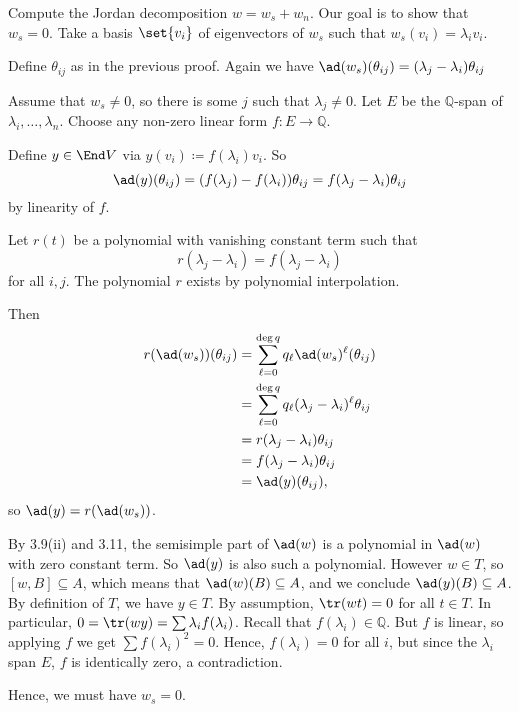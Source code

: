 Compute the Jordan decomposition $w = w_s + w_n$. Our goal is to show that $w_s = 0$.
Take a basis $\set{v_i}$ of eigenvectors of $w_s$ such that $w_s(v_i) = \lambda_iv_i$.

Define $\theta_{ij}$ as in the previous proof. Again we have
$\ad(w_s)(\theta_{ij}) = (\lambda_j - \lambda_i)\theta_{ij}$

Assume that $w_s\neq 0$, so there is some $j$ such that $\lambda_j\neq 0$.
Let $E$ be the $\mathbb{Q}$-span of $\lambda_i, \ldots, \lambda_n$.
Choose any non-zero linear form $f\colon E\to \mathbb{Q}$.

Define $y \in \End V$ via $y(v_i)\coloneqq f(\lambda_i)v_i$.
So
\[ \ad(y)(\theta_{ij}) = (f(\lambda_j) - f(\lambda_i))\theta_{ij}
= f(\lambda_j - \lambda_i)\theta_{ij} \]
by linearity of $f$.

Let $r(t)$ be a polynomial with vanishing constant term such that
\[ r(\lambda_j - \lambda_i) = f(\lambda_j - \lambda_i) \]
for all $i, j$. The polynomial $r$ exists by polynomial interpolation.

Then
\begin{align*}
	r(\ad(w_s))(\theta_{ij}) &= \sum_{\ell = 0}^{\deg q}q_\ell\ad(w_s)^\ell(\theta_{ij})\\
	&= \sum_{\ell = 0}^{\deg q}q_{\ell}(\lambda_j - \lambda_i)^\ell\theta_{ij}\\
	&= r(\lambda_j - \lambda_i)\theta_{ij}\\
	&= f(\lambda_j - \lambda_i)\theta_{ij}\\
	&= \ad(y)(\theta_{ij}),\\
\end{align*}
so $\ad(y) = r(\ad(w_s))$.

By 3.9(ii) and 3.11, the semisimple part of $\ad(w)$ is a polynomial in
$\ad(w)$ with zero constant term. So $\ad(y)$ is also such a polynomial.
However $w \in T$, so $[w, B] \subseteq A$, which means that $\ad(w)(B) \subseteq A$,
and we conclude $\ad(y)(B) \subseteq A$. By definition of $T$, we have
$y \in T$. By assumption, $\tr(wt) = 0$ for all $t \in T$. In particular,
$0 = \tr(wy) = \sum \lambda_i f(\lambda_i)$. Recall that $f(\lambda_i) \in \mathbb{Q}$.
But $f$ is linear, so applying $f$ we get $\sum f(\lambda_i)^2 = 0$. Hence,
$f(\lambda_i) = 0$ for all $i$, but since the $\lambda_i$ span $E$, $f$ is
identically zero, a contradiction.

Hence, we must have $w_s = 0$.
